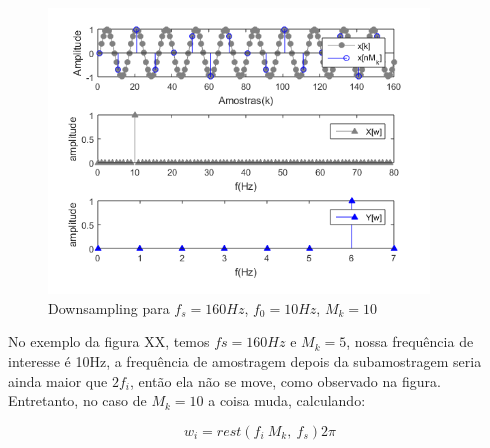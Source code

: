\documentclass[a4paper, 12pt]{book}
\begin{document}
\begin{figure}[h]
	\centering
	\includegraphics[width=0.9\textwidth]{../figuras/downsample2.png}
	\caption{Downsampling para $f_s=160Hz$, $f_0=10Hz$, $M_k=10$}
	\label{fig:f5}
\end{figure}

No exemplo da figura XX, temos $fs=160Hz$ e $M_k=5$, nossa frequência de interesse é 10Hz, a frequência de amostragem depois da subamostragem seria ainda maior que $2f_i$, então ela não se move, como observado na figura. Entretanto, no caso de $M_k=10$ a coisa muda, calculando:

\begin{equation}
w_i=rest(f_i \: M_k, \: f_s)2\pi
\end{equation}
\end{document}
